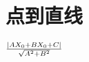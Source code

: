 \documentclass[UTF8]{ctexart}
\begin{document}
\section{点到直线}
$ {\left |{AX_0+BX_0+C} \right |} \over \sqrt{A^2+B^2} $
\end{document}
